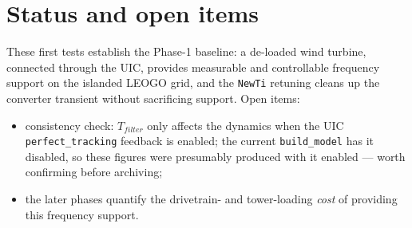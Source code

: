 \documentclass[11pt]{article}
\begin{document}
\section{Status and open items}
\label{sec:dft-status}
These first tests establish the Phase-1 baseline: a de-loaded wind turbine,
connected through the UIC, provides measurable and controllable frequency
support on the islanded LEOGO grid, and the \texttt{NewTi} retuning cleans up the
converter transient without sacrificing support. Open items:
\begin{itemize}
  \item consistency check: \(T_{filter}\) only affects the dynamics when the UIC
        \texttt{perfect\_tracking} feedback is enabled; the current
        \texttt{build\_model} has it disabled, so these figures were presumably
        produced with it enabled --- worth confirming before archiving;
  \item the later phases quantify the drivetrain- and tower-loading \emph{cost}
        of providing this frequency support.
\end{itemize}
\end{document}
